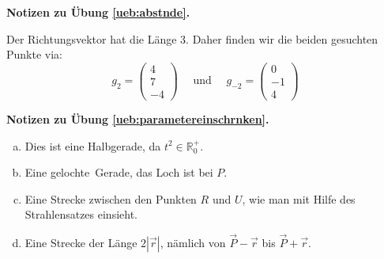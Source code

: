 \documentclass[%
11pt,%
twoside,%
titlepage,%
german,%
headsepline%
]{scrartcl}
\theoremstyle{definition}
\theoremstyle{plain}
\newcommand{\concatueb}[1]{ueb:#1}%
\newcommand{\concatlsg}[1]{lsg:#1}%
\newenvironment{lsg}[1]{%
    \par\noindent\textbf{Notizen zu Übung \ref{\concatueb{#1}}.}%
    \label{\concatlsg{#1}}
}{%
    \par%
}
\begin{document}
\begin{lsg}{abstnde}
Der Richtungsvektor hat die Länge $3$. Daher finden wir die beiden gesuchten Punkte via:
$$g_2=\begin{pmatrix}4\\7\\-4\end{pmatrix}\quad\text{ und }\quad g_{-2}=\begin{pmatrix}0\\-1\\4\end{pmatrix}$$
\end{lsg}
\begin{lsg}{parametereinschrnken}
\begin{enumerate}[a)]
    \item Dies ist eine Halbgerade, da $t^2\in\mathbb{R}^+_0$.
    \item Eine \glqq gelochte\grqq\ Gerade, das Loch ist bei $P$.
    \item Eine Strecke zwischen den Punkten $R$ und $U$, wie man mit Hilfe des Strahlensatzes einsieht.
    \item Eine Strecke der Länge $2|\vec{r}|$, nämlich von $\vec{P}-\vec{r}$ bis $\vec{P}+\vec{r}$.
\end{enumerate}
\end{lsg}
\end{document}
